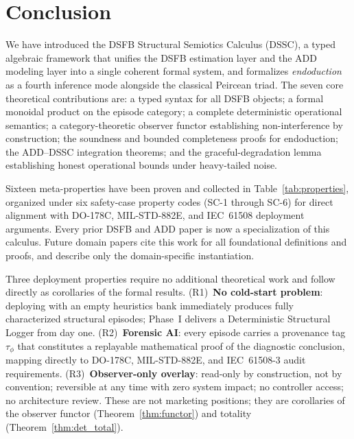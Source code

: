 \documentclass[11pt,a4paper]{article}
\theoremstyle{plain}
\theoremstyle{definition}
\theoremstyle{remark}
\begin{document}
\section{Conclusion}
\label{sec:conclusion}

We have introduced the DSFB Structural Semiotics Calculus (DSSC), a typed algebraic framework
that unifies the DSFB estimation layer and the ADD modeling layer into a single coherent formal
system, and formalizes \emph{endoduction} as a fourth inference mode alongside the classical
Peircean triad. The seven core theoretical contributions are: a typed syntax for all DSFB
objects; a formal monoidal product on the episode category; a complete deterministic operational
semantics; a category-theoretic observer functor establishing non-interference by construction;
the soundness and bounded completeness proofs for endoduction; the ADD--DSSC integration
theorems; and the graceful-degradation lemma establishing honest operational bounds under
heavy-tailed noise.

Sixteen meta-properties have been proven and collected in Table~\ref{tab:properties}, organized
under six safety-case property codes (SC-1 through SC-6) for direct alignment with DO-178C,
MIL-STD-882E, and IEC~61508 deployment arguments. Every prior DSFB and ADD paper is now a
specialization of this calculus. Future domain papers cite this work for all foundational
definitions and proofs, and describe only the domain-specific instantiation.

Three deployment properties require no additional theoretical work and follow directly as
corollaries of the formal results. (R1)~\textbf{No cold-start problem}: deploying with an
empty heuristics bank immediately produces fully characterized structural episodes; Phase~I
delivers a Deterministic Structural Logger from day one. (R2)~\textbf{Forensic AI}: every
episode carries a provenance tag $\tau_\phi$ that constitutes a replayable mathematical
proof of the diagnostic conclusion, mapping directly to DO-178C, MIL-STD-882E, and
IEC~61508-3 audit requirements. (R3)~\textbf{Observer-only overlay}: read-only by
construction, not by convention; reversible at any time with zero system impact; no
controller access; no architecture review. These are not marketing positions; they are
corollaries of the observer functor (Theorem~\ref{thm:functor}) and totality
(Theorem~\ref{thm:det_total}).
\end{document}
